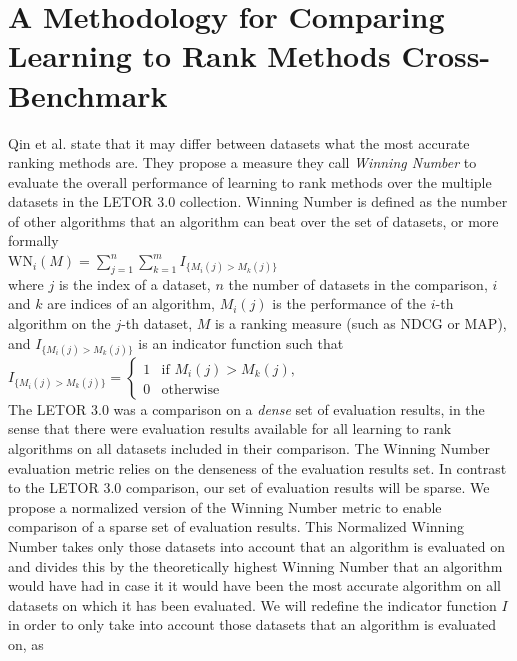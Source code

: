 \documentclass{sig-alternate}
\begin{document}
\section{A Methodology for Comparing Learning to Rank Methods Cross-Benchmark}
Qin et al. \cite{Qin2010} state that it may differ between datasets what the most accurate ranking methods are. They propose a measure they call \emph{Winning Number} to evaluate the overall performance of learning to rank methods over the multiple datasets in the LETOR 3.0 collection. Winning Number is defined as the number of other algorithms that an algorithm can beat over the set of datasets, or more formally\\

$\text{WN}_i(M) = \sum\nolimits_{j=1}^n \sum\nolimits_{k=1}^m I_{\{M_i(j)>M_k(j)\}}$\\

where $j$ is the index of a dataset, $n$ the number of datasets in the comparison, $i$ and $k$ are indices of an algorithm, $M_i(j)$ is the performance of the $i$-th algorithm on the $j$-th dataset, $M$ is a ranking measure (such as NDCG or MAP), and $I_{\{M_i(j)>M_k(j)\}}$ is an indicator function such that\\

$I_{\{M_i(j)>M_k(j)\}} = \begin{cases}
1 & \text{if } M_i(j) > M_k(j), \\
0 & \text{otherwise}
\end{cases}$\\

The LETOR 3.0 was a comparison on a \emph{dense} set of evaluation results, in the sense that there were evaluation results available for all learning to rank algorithms on all datasets included in their comparison. The Winning Number evaluation metric relies on the denseness of the evaluation results set. In contrast to the LETOR 3.0 comparison, our set of evaluation results will be sparse. We propose a normalized version of the Winning Number metric to enable comparison of a sparse set of evaluation results. This Normalized Winning Number takes only those datasets into account that an algorithm is evaluated on and divides this by the theoretically highest Winning Number that an algorithm would have had in case it it would have been the most accurate algorithm on all datasets on which it has been evaluated. We will redefine the indicator function $I$ in order to only take into account those datasets that an algorithm is evaluated on, as\\
\end{document}
